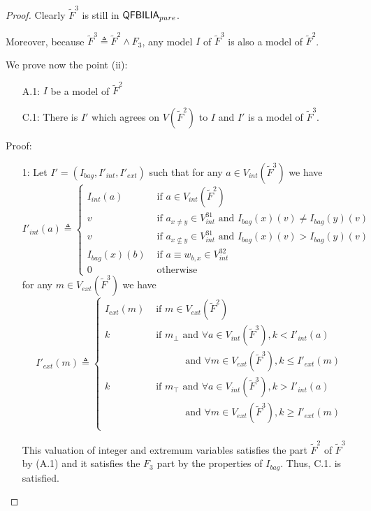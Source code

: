 \begin{proof}
Clearly $\tilde{F}^3$ is still in $\textsf{QFBILIA}_{pure}$.

Moreover, because $\tilde{F}^3 \triangleq \tilde{F}^2 \land F_{3}$, any model $I$ of $\tilde{F}^3$ is also a model of $\tilde{F}^2$.

We prove now the point (ii):
\begin{enumerate}
\item[A.1:] $I$ be a model of $\tilde{F}^2$
\item[C.1:] There is $I'$ which agrees on $V(\tilde{F}^2)$ to $I$ and $I'$ is a model of $\tilde{F}^3$.
\end{enumerate}
Proof:
\begin{enumerate}
\item[1:] Let $I'=(I_{bag}, I'_{int}, I'_{ext})$ such that for any $a\in V_{int}(\tilde{F}^3)$ we have
$$
I'_{int}(a) \triangleq \left\{
\begin{array}{ll}
I_{int}(a) & \mbox{ if } a \in V_{int}(\tilde{F}^2) \\
v & \mbox{ if } a_{x\neq y} \in V^{31}_{int} \mbox{ and } I_{bag}(x)(v) \neq I_{bag}(y)(v) \\
v & \mbox{ if } a_{x\nsubseteq y} \in V^{31}_{int} \mbox{ and } I_{bag}(x)(v) > I_{bag}(y)(v) \\
I_{bag}(x)(b) & \mbox{ if } a \equiv w_{b,x} \in V^{32}_{int} \\
0 & \mbox{ otherwise} %
\end{array}\right.
$$
for any $m\in V_{ext}(\tilde{F}^3)$ we have
$$
I'_{ext}(m) \triangleq \left\{
\begin{array}{ll}
I_{ext}(m) & \mbox{ if } m \in V_{ext}(\tilde{F}^2) \\
k & \mbox{ if } m_{\bot} \mbox{ and } \forall a \in V_{int}(\tilde{F}^3), k<I'_{int}(a) \\
& \quad\quad\quad \mbox{ and } \forall m \in V_{ext}(\tilde{F}^3), k\leq I'_{ext}(m)\\
k & \mbox{ if } m_{\top} \mbox{ and } \forall a \in V_{int}(\tilde{F}^3), k>I'_{int}(a) \\
& \quad\quad\quad \mbox{ and } \forall m \in V_{ext}(\tilde{F}^3), k\geq I'_{ext}(m)\\
\end{array}\right.
$$

This valuation of integer and extremum variables satisfies the part $\tilde{F}^2$ of $\tilde{F}^3$ by (A.1)
and it satisfies the $F_{3}$ part by the properties of $I_{bag}$.
Thus, C.1. is satisfied.
\end{enumerate}
\end{proof}

